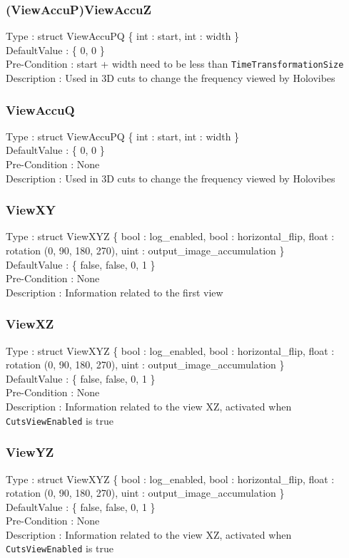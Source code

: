 \subsubsection{(ViewAccuP)ViewAccuZ}
\noindent
Type : struct ViewAccuPQ \{ int : start, int : width \}\\
DefaultValue : \{ 0, 0 \}\\
Pre-Condition : start + width need to be less than \verb|TimeTransformationSize|\\
Description : Used in 3D cuts to change the frequency viewed by Holovibes\\

\subsubsection{ViewAccuQ}
\noindent
Type : struct ViewAccuPQ \{ int : start, int : width \}\\
DefaultValue : \{ 0, 0 \}\\
Pre-Condition : None\\
Description : Used in 3D cuts to change the frequency viewed by Holovibes\\

\subsubsection{ViewXY}
\noindent
Type : struct ViewXYZ \{ bool : log\_enabled, bool : horizontal\_flip, float : rotation (0, 90, 180, 270), uint : output\_image\_accumulation \}\\
DefaultValue : \{ false, false, 0, 1 \}\\
Pre-Condition : None\\
Description : Information related to the first view\\

\subsubsection{ViewXZ}
\noindent
Type : struct ViewXYZ \{ bool : log\_enabled, bool : horizontal\_flip, float : rotation (0, 90, 180, 270), uint : output\_image\_accumulation \}\\
DefaultValue : \{ false, false, 0, 1 \}\\
Pre-Condition : None\\
Description : Information related to the view XZ, activated when \verb|CutsViewEnabled| is true\\

\subsubsection{ViewYZ}
\noindent
Type : struct ViewXYZ \{ bool : log\_enabled, bool : horizontal\_flip, float : rotation (0, 90, 180, 270), uint : output\_image\_accumulation \}\\
DefaultValue : \{ false, false, 0, 1 \}\\
Pre-Condition : None\\
Description : Information related to the view XZ, activated when \verb|CutsViewEnabled| is true\\

